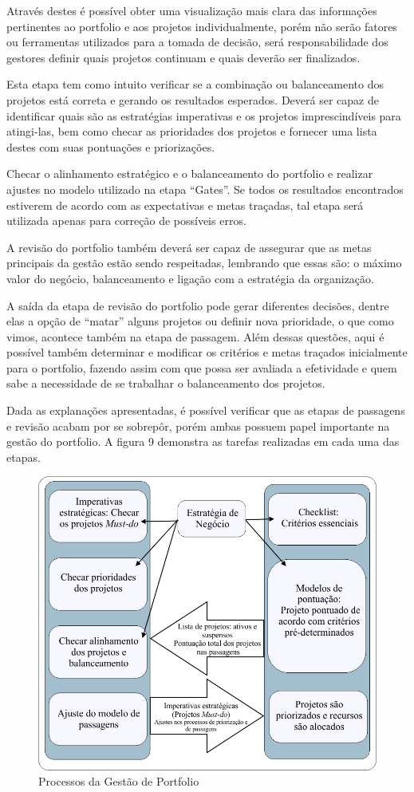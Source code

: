 \documentclass[12pt,a4paper,ruledheader,tocpage=prefix,floatnumber=continuous,pagestart=folhaderosto,font=times]{abnt}
\begin{document}
Através destes é possível obter uma visualização mais clara das informações pertinentes ao portfolio e aos projetos individualmente, 
porém não serão fatores ou ferramentas utilizados para a tomada de decisão, será responsabilidade dos gestores definir quais projetos continuam e quais 
deverão ser finalizados.

Esta etapa tem como intuito verificar se a combinação ou balanceamento dos projetos está correta e gerando os resultados esperados. Deverá ser capaz de
identificar quais são as estratégias imperativas e os projetos imprescindíveis para atingi-las, bem como checar as prioridades dos projetos e fornecer uma
lista destes com suas pontuações e priorizações. 

Checar o alinhamento estratégico e o balanceamento do portfolio e realizar ajustes no modelo utilizado na etapa ``Gates''. Se todos os resultados 
encontrados estiverem de acordo com as expectativas e metas traçadas, tal etapa será utilizada apenas para correção de possíveis erros. 

A revisão do portfolio também deverá ser capaz de assegurar que as metas principais da gestão estão sendo respeitadas, lembrando que 
essas são: o máximo valor do negócio, balanceamento e ligação com a estratégia da organização.

A saída da etapa de revisão do portfolio pode gerar diferentes decisões, dentre elas a opção de ``matar'' alguns projetos ou definir nova prioridade, o que
como vimos, acontece também na etapa de passagem. Além dessas questões, aqui é possível também determinar e modificar os critérios e metas traçados inicialmente
para o portfolio, fazendo assim com que possa ser avaliada a efetividade e quem sabe a necessidade de se trabalhar o balanceamento dos projetos.

Dada as explanações apresentadas, é possível verificar que as etapas de passagens e revisão acabam por se sobrepôr, porém ambas possuem papel
importante na gestão do portfolio. A figura 9 demonstra as tarefas realizadas em cada uma das etapas.

\begin{figure}[H]
\centering
\includegraphics[width=.7\textwidth]{img/fig9.png}
\caption{Processos da Gestão de Portfolio\cite{COOPER2001}}
\end{figure}
\end{document}
